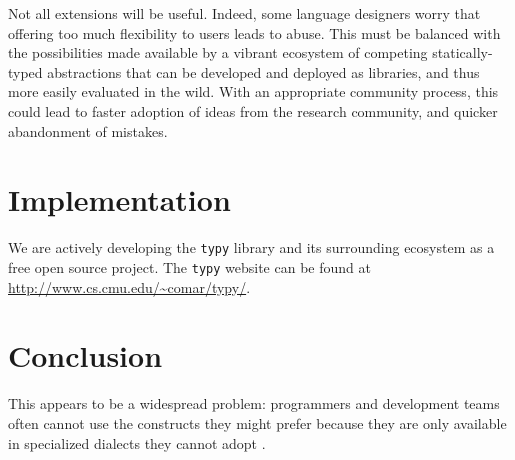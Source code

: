 \documentclass[preprint,10pt]{sigplanconf}
\newcommand{\lip}[1]{\lstinline[language=Python,basicstyle=\ttfamily\small,deletendkeywords={tuple,buffer,map}]{#1}}
\begin{document}
%
% 
%
%

Not all extensions will be useful. Indeed, some language designers worry that offering too much flexibility to users leads to abuse. This must be balanced with the possibilities made available by a vibrant ecosystem of competing statically-typed abstractions that can be developed and deployed as libraries, and thus more easily evaluated in the wild. With an appropriate community process, this could lead to faster adoption of ideas from the research community, and quicker abandonment of mistakes. %
% 


\section{Implementation}
We are actively developing the \verb|typy| library and its surrounding ecosystem as a free open source project. The \lip{typy} website can be found at \url{http://www.cs.cmu.edu/~comar/typy/}.

\section{Conclusion}This appears to be a widespread problem: programmers and development teams often cannot use  the constructs they might prefer because they are only available in specialized dialects they cannot  adopt \cite{Meyerovich:2012:SDR:2414721.2414724,Meyerovich:2013:EAP:2509136.2509515}. %
\end{document}
